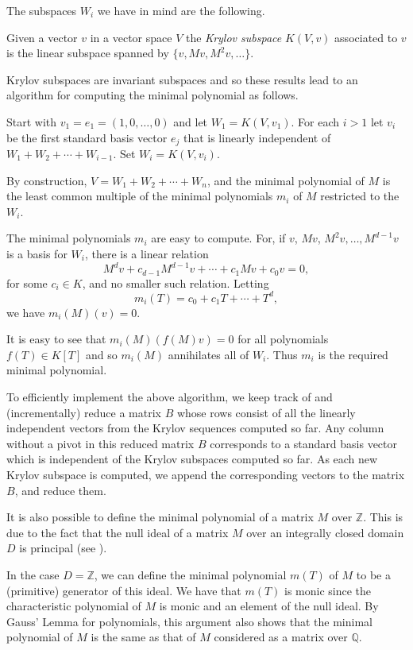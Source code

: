 \documentclass{sig-alternate-05-2015}
\begin{document}
The subspaces $W_i$ we have in mind are the following.

\begin{definition}
Given a vector $v$ in a vector space $V$ the \emph{Krylov subspace} $K(V, v)$
associated to $v$ is the linear subspace spanned by $\{v, Mv, M^2v, \ldots\}$.
\end{definition}

Krylov subspaces are invariant subspaces and so these results lead to an
algorithm for computing the minimal polynomial as follows.

Start with $v_1 = e_1 = (1, 0, \ldots, 0)$ and let $W_1 = K(V, v_1)$.
For each $i > 1$ let $v_i$ be the first standard basis vector $e_j$ that is
linearly independent of $W_1 + W_2 + \cdots + W_{i-1}$. Set
$W_i = K(V, v_i)$. 

By construction, $V = W_1 + W_2 + \cdots + W_n$, and the minimal polynomial
of $M$ is the least common multiple of the minimal polynomials $m_i$ of
$M$ restricted to the $W_i$.

The minimal polynomials $m_i$ are easy to compute.
For, if $v$, $Mv$, $M^2v, \ldots, M^{d-1}v$ is a basis for $W_i$,
there is a linear relation 
$$M^dv + c_{d-1}M^{d-1}v + \cdots + c_1Mv + c_0v = 0,$$
for some $c_i \in K$, and no smaller such relation. Letting
$$m_i(T) = c_0 + c_1T + \cdots + T^d,$$ we have $m_i(M)(v) = 0$.

It is easy to see that $m_i(M)(f(M)v) = 0$ for all polynomials $f(T) \in K[T]$
and so $m_i(M)$ annihilates all of $W_i$. Thus $m_i$ is the required
minimal polynomial. 
 
To efficiently implement the above algorithm, we keep track of and
(incrementally) reduce a matrix $B$ whose rows consist of all the
linearly independent vectors from the Krylov sequences computed so far.
Any column without a pivot in this reduced matrix $B$ corresponds to a
standard basis vector which is independent of the Krylov subspaces computed
so far. As each new Krylov subspace is computed, we append the corresponding
vectors to the matrix $B$, and reduce them.

It is also possible to define the minimal polynomial of a matrix $M$ over
$\mathbb{Z}$. This is due to the fact that the null ideal of a matrix $M$ over
an integrally closed domain $D$ is principal (see \cite{brown}).

In the case $D = \mathbb{Z}$, we can define the minimal polynomial $m(T)$ of $M$
to be a (primitive) generator of this ideal. We have that $m(T)$ is monic since
the characteristic polynomial of $M$ is monic and an element of the null ideal.
By Gauss' Lemma for polynomials, this argument also shows that the minimal
polynomial of $M$ is the same as that of $M$ considered as a matrix over
$\mathbb{Q}$.
\end{document}
